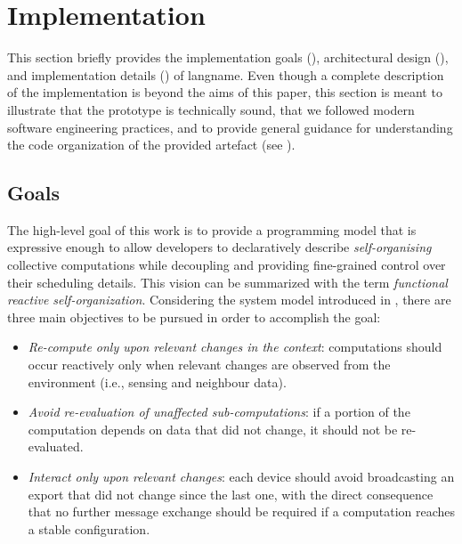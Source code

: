 \section{Implementation}
\label{acsos2023-frp:sec:impl}


This section briefly provides the implementation goals (), architectural design (), and implementation details () of \ac{langname}.
%
Even though a complete description of the implementation is beyond the aims of this paper,
 this section is meant to illustrate that 
 the prototype is technically sound,
 that we followed modern software engineering practices,
 and to provide general guidance for understanding the code organization of the provided artefact (see ).

\subsection{Goals}
\label{acsos2023-frp:sec:impl:goals}

The high-level goal of this work is to provide a programming model
that is expressive enough to allow developers
to declaratively describe \textit{self-organising} collective computations
while decoupling and providing fine-grained control over their scheduling details.
%
This vision can be summarized with the term \textit{functional reactive self-organization}.
%
Considering the system model introduced in ,
 there are three main objectives to be pursued in order to accomplish the goal:
%
\begin{itemize}
    \item \emph{Re-compute only upon \emph{relevant} changes in the context}: computations should occur reactively only when relevant changes are observed from the environment (i.e., sensing and neighbour data). %
    \item \emph{Avoid re-evaluation of unaffected sub-computations}: if a portion of the computation depends on data that did not change, it should not be re-evaluated.
    \item \emph{Interact only upon relevant changes}: each device should avoid broadcasting an export that did not change since the last one, with the direct consequence that no further message exchange should be required if a computation reaches a stable configuration.
\end{itemize}

